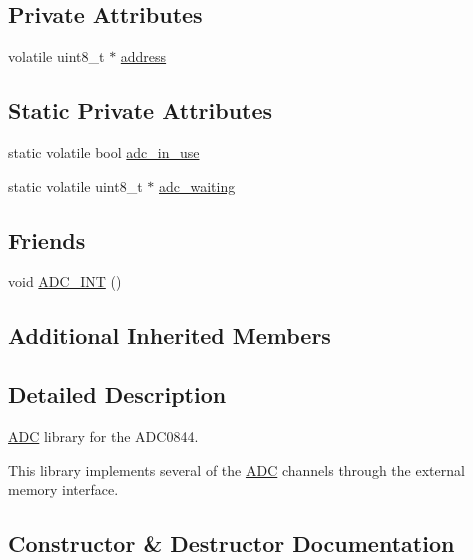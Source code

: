 \subsection*{Private Attributes}
\begin{DoxyCompactItemize}
\item 
volatile uint8\+\_\+t $\ast$ \hyperlink{class_a_d_c_aa58c27581281db4bd8537df9ea2b49f2}{address}
\end{DoxyCompactItemize}
\subsection*{Static Private Attributes}
\begin{DoxyCompactItemize}
\item 
static volatile bool \hyperlink{class_a_d_c_a13bcfd20fa1d5e80520e1485ac736afe}{adc\+\_\+in\+\_\+use}
\item 
static volatile uint8\+\_\+t $\ast$ \hyperlink{class_a_d_c_a49c064d21c7bf460dc86c001db2747d9}{adc\+\_\+waiting}
\end{DoxyCompactItemize}
\subsection*{Friends}
\begin{DoxyCompactItemize}
\item 
void \hyperlink{class_a_d_c_aa44874a8e770dad4585e5cce5f9d252d}{A\+D\+C\+\_\+\+I\+NT} ()
\end{DoxyCompactItemize}
\subsection*{Additional Inherited Members}


\subsection{Detailed Description}
\hyperlink{class_a_d_c}{A\+DC} library for the A\+D\+C0844. 

This library implements several of the \hyperlink{class_a_d_c}{A\+DC} channels through the external memory interface. 

\subsection{Constructor \& Destructor Documentation}
\hypertarget{class_a_d_c_ab20b8e5645442615d875d2cef89bc488}{}\label{class_a_d_c_ab20b8e5645442615d875d2cef89bc488} 
